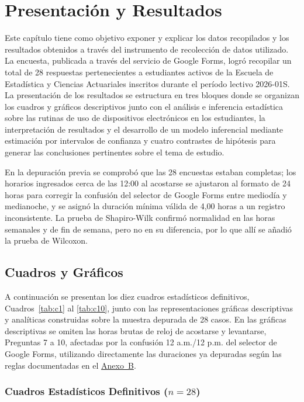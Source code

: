 \documentclass[12pt, letterpaper]{article}
\begin{document}
\section{Presentación y Resultados}

Este capítulo tiene como objetivo exponer y explicar los datos recopilados y los resultados obtenidos a través del instrumento de recolección de datos utilizado. La encuesta, publicada a través del servicio de Google Forms, logró recopilar un total de 28 respuestas pertenecientes a estudiantes activos de la Escuela de Estadística y Ciencias Actuariales inscritos durante el período lectivo 2026-01S. La presentación de los resultados se estructura en tres bloques donde se organizan los cuadros y gráficos descriptivos junto con el análisis e inferencia estadística sobre las rutinas de uso de dispositivos electrónicos en los estudiantes, la interpretación de resultados y el desarrollo de un modelo inferencial mediante estimación por intervalos de confianza y cuatro contrastes de hipótesis para generar las conclusiones pertinentes sobre el tema de estudio.

En la depuración previa se comprobó que las 28 encuestas estaban completas; los horarios ingresados cerca de las 12:00 al acostarse se ajustaron al formato de 24 horas para corregir la confusión del selector de Google Forms entre mediodía y medianoche, y se asignó la duración mínima válida de 4,00 horas a un registro inconsistente. La prueba de Shapiro-Wilk confirmó normalidad en las horas semanales y de fin de semana, pero no en su diferencia, por lo que allí se añadió la prueba de Wilcoxon.

\subsection{Cuadros y Gráficos}

A continuación se presentan los diez cuadros estadísticos definitivos, Cuadros~\ref{tab:c1} al \ref{tab:c10}, junto con las representaciones gráficas descriptivas y analíticas construidas sobre la muestra depurada de 28 casos. En las gráficas descriptivas se omiten las horas brutas de reloj de acostarse y levantarse, Preguntas 7 a 10, afectadas por la confusión 12 a.m./12 p.m. del selector de Google Forms, utilizando directamente las duraciones ya depuradas según las reglas documentadas en el \hyperref[subsec:anexob]{Anexo~B}.

\subsubsection{Cuadros Estadísticos Definitivos \texorpdfstring{($n = 28$)}{(n = 28)}}
\end{document}
